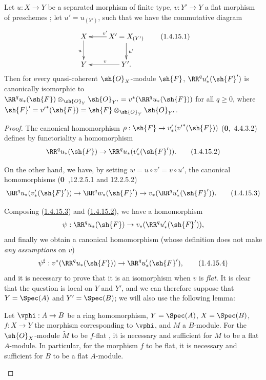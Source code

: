 \begin{proposition}[1.4.15]
\label{III.1.4.15}
Let $u:X\to Y$ be a separated morphism of finite type, $v:Y'\to Y$ a flat morphism of preschemes ; let $u'=u_{(Y')}$, such that we have the commutative diagram
\[
  \xymatrix{
    X\ar[d]_u &
    X'=X_{(Y')}\ar[l]_{v'}\ar[d]^{u'}\\
    Y &
    Y'\ar[l]_{v}.
  }
  \tag{1.4.15.1}
  \label{III.1.4.15.1}
\]
Then for every quasi-coherent $\sh{O}_X$-module $\sh{F}$, $\RR^q u_*'(\sh{F}')$ is canonically isomorphic to $\RR^q u_*(\sh{F})\otimes_{\sh{O}_Y}\sh{O}_{Y'}=v^*(\RR^q u_*(\sh{F}))$ for all $q\geq 0$, where $\sh{F}'={v'}^*(\sh{F})=\sh{F}\otimes_{\sh{O}_Y}\sh{O}_{Y'}$.
\end{proposition}

\begin{proof}
The canonical homomorphism $\rho:\sh{F}\to v_*'({v'}^*(\sh{F}))$ (\textbf{0},~4.4.3.2) defines by functoriality a homomorphism
\[
  \RR^q u_*(\sh{F})\to\RR^q u_*(v_*'(\sh{F}')).
  \tag{1.4.15.2}\label{III.1.4.15.2}
\]

On the other hand, we have, by setting $w=u\circ v'=v\circ u'$, the canonical homomorphisms (\textbf{0}~,12.2.5.1 and 12.2.5.2)
\[
  \RR^q u_*(v_*'(\sh{F}'))\to\RR^q w_*(\sh{F}')\to v_*(\RR^q u_*'(\sh{F}')).
  \tag{1.4.15.3}\label{III.1.4.15.3}
\]

Composing (\hyperref[III.1.4.15.3]{1.4.15.3}) and (\hyperref[III.1.4.15.2]{1.4.15.2}), we have a homomorphism
\[
  \psi:\RR^q u_*(\sh{F})\to v_*(\RR^q u_*'(\sh{F}')),
\]
and finally we obtain a canonical homomorphism (whose definition does not make \emph{any assumptions} on $v$)
\[
  \psi^\sharp:v^*(\RR^q u_*(\sh{F}))\to\RR^q u_*'(\sh{F}'),
  \tag{1.4.15.4}
\]
and it is necessary to prove that it is an isomorphism when $v$ is \emph{flat}.
It is clear that the question is local on $Y$ and $Y'$, and we can therefore suppose that $Y=\Spec(A)$ and $Y'=\Spec(B)$; we will also use the following lemma:
\begin{lemma}[1.4.15.5]
\label{III.1.4.15.5}
Let $\vphi:A\to B$ be a ring homomorphism, $Y=\Spec(A)$, $X=\Spec(B)$, $f:X\to Y$ the morphism corresponding to $\vphi$, and $M$ a $B$-module.
For the $\sh{O}_X$-module $\widetilde{M}$ to be $f$-flat , it is necessary and sufficient for $M$ to be a flat $A$-module.
In particular, for the morphism $f$ to be flat, it is necessary and sufficient for $B$ to be a flat $A$-module.
\end{lemma}


\end{proof}
